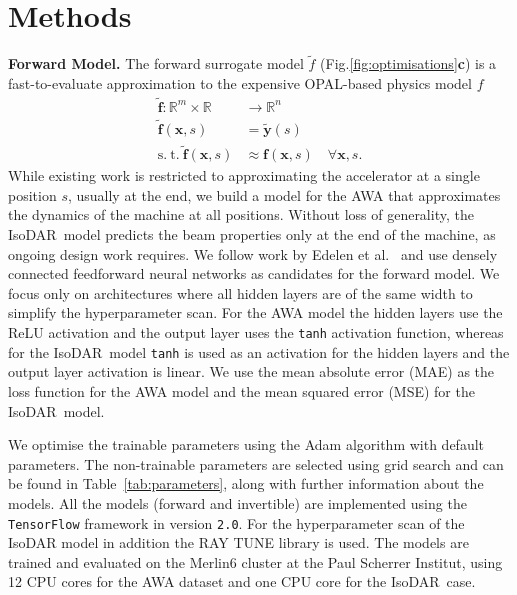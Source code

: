 \documentclass[a4paper, 12pt, version-1-compatibility]{article}
\def\forwardmodel{forward model}
\def\isodar{IsoDAR}
\newcommand{\figref}[1]{Fig.\xspace\ref{#1}}
\newcommand{\tabref}[1]{Table~\ref{#1}}
\newcommand{\myvec}[1]{\mathbf{#1}}
\begin{document}


\section*{Methods}



{\bf Forward Model.}
\label{sec:forward_model}
The forward surrogate model $\tilde{f}$ (\figref{fig:optimisations}\textbf{c}) is a fast-to-evaluate approximation to the expensive OPAL-based physics model $f$
\begin{align*}
    \myvec{\tilde{f}}: \mathbb{R}^m \times \mathbb{R} &\rightarrow \mathbb{R}^n\\
    \myvec{\tilde{f}}(\myvec{x}, s) &= \myvec{\tilde{y}}(s)\\
    \mathrm{s.\ t.\ } \myvec{\tilde{f}}(\myvec{x}, s) &\approx \myvec{f}(\myvec{x}, s) \quad \forall \myvec{x}, s.
\end{align*}
While existing work \cite{ml_speedup} is restricted to approximating the accelerator at a single position $s$, usually at the end, we build a model for the AWA that approximates the dynamics of the machine at all positions. Without loss of generality, the \isodar\ model predicts the beam properties only at the end of the machine, as ongoing design work requires. We follow work by Edelen et al.\ \cite{ml_speedup} and use densely connected feedforward neural networks \cite{deeplearning} as candidates for the \forwardmodel. We focus only on architectures where all hidden layers are of the same width to simplify the hyperparameter scan. For the AWA model the hidden layers use the ReLU activation and the output layer uses the \texttt{tanh} activation function, whereas for the \isodar\ model \texttt{tanh} is used as an activation for the hidden layers and the output layer activation is linear. We use the mean absolute error (MAE) as the loss function for the AWA model and the mean squared error (MSE) for the \isodar\ model.

We optimise the trainable parameters using the Adam algorithm with default parameters. The non-trainable parameters are selected using grid search and can be found in \tabref{tab:parameters}, along with further information about the models. All the models (forward and invertible) are implemented using the \texttt{TensorFlow} framework \cite{tensorflow2015-whitepaper} in version \texttt{2.0}. For the hyperparameter scan of the IsoDAR model in addition the RAY TUNE library \cite{liaw2018tune} is used. The models are trained and evaluated on the Merlin6 cluster at the Paul Scherrer Institut, using 12 CPU cores for the AWA dataset and one CPU core for the \isodar\ case.
\end{document}
